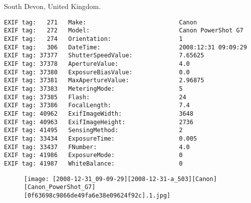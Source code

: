 \section{\protect{}}
\noindent South Devon, United Kingdom.
\noindent
\begin{lstlisting}
EXIF tag:   271   Make:                          Canon
EXIF tag:   272   Model:                         Canon PowerShot G7
EXIF tag:   274   Orientation:                   1
EXIF tag:   306   DateTime:                      2008:12:31 09:09:29
EXIF tag: 37377   ShutterSpeedValue:             7.65625
EXIF tag: 37378   ApertureValue:                 4.0
EXIF tag: 37380   ExposureBiasValue:             0.0
EXIF tag: 37381   MaxApertureValue:              2.96875
EXIF tag: 37383   MeteringMode:                  5
EXIF tag: 37385   Flash:                         24
EXIF tag: 37386   FocalLength:                   7.4
EXIF tag: 40962   ExifImageWidth:                3648
EXIF tag: 40963   ExifImageHeight:               2736
EXIF tag: 41495   SensingMethod:                 2
EXIF tag: 33434   ExposureTime:                  0.005
EXIF tag: 33437   FNumber:                       4.0
EXIF tag: 41986   ExposureMode:                  0
EXIF tag: 41987   WhiteBalance:                  0

\end{lstlisting}
\clearpage
\begin{figure}
\raggedleft
\texttt{[image: [2008-12-31\_09-09-29][2008-12-31-a\_503][Canon][Canon\_PowerShot\_G7][0f63698c9866de49fa6e38e09624f92c].1.jpg]}
\end{figure}


\clearpage
